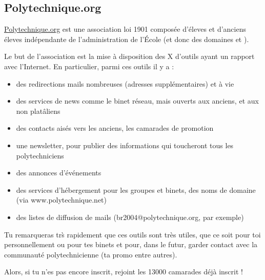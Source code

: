 \subsection{Polytechnique.org}
\url{Polytechnique.org} est une association loi 1901 compos\'ee d'\'eleves et d'anciens \'eleves 
 ind\'ependante de l'administration de l'\'Ecole (et donc des domaines 
 et ).


Le but de l'association est la mise \`a disposition des X d'outils ayant un rapport avec l'Internet. En particulier, parmi ces outils il y a :
\begin{itemize}
  \item des redirections mails nombreuses (adresses suppl\'ementaires) et \`a vie
  \item des services de news comme le binet r\'eseau, mais ouverts aux anciens, et aux non plat\^aliens
  \item des contacts ais\'es vers les anciens, les camarades de promotion
  \item une newsletter, pour publier des informations qui toucheront tous les polytechniciens
  \item des annonces d'\'ev\'enements
  \item des services d'h\'ebergement pour les groupes et binets, des noms de domaine (via www.polytechnique.net)
  \item des listes de diffusion de mails (br2004@polytechnique.org, par exemple)
\end{itemize}


Tu remarqueras tr\`s rapidement que ces outils sont tr\`es utiles, que ce soit pour toi personnellement ou pour tes binets et pour, dans le futur, garder contact avec la communaut\'e polytechnicienne (ta promo entre autres).


Alors, si tu n'es pas encore inscrit, rejoint les 13000 camarades d\'ej\`a inscrit !